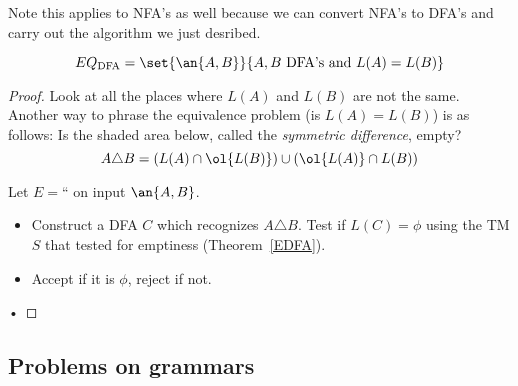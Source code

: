 Note this applies to NFA's as well because we can convert NFA's to DFA's and carry out the algorithm we just desribed.
\begin{thm}
\[
EQ_{\text{DFA}}=\set{\an{A,B}}{A,B\text{ DFA's and }L(A)=L(B)}
\]
\end{thm}
\begin{proof}

Look at all the places where $L(A)$ and $L(B)$ are not the same. Another way to phrase the equivalence problem (is $L(A)=L(B)$) is as follows: Is the shaded area below, called the {\it symmetric difference}, empty?
\[
A\triangle B=(L(A)\cap \ol{L(B)})\cup (\ol{L(A)}\cap L(B))
\]


Let $E=$`` on input $\an{A,B}$.
\begin{itemize}
\item
Construct a DFA $C$ which recognizes $A\triangle B$. Test if $L(C)=\phi$  using the TM $S$ that tested for emptiness (Theorem~\ref{EDFA}).
\item
Accept if it is $\phi$, reject if not.
\end{itemize}•
\end{proof}

\subsection{Problems on grammars}


